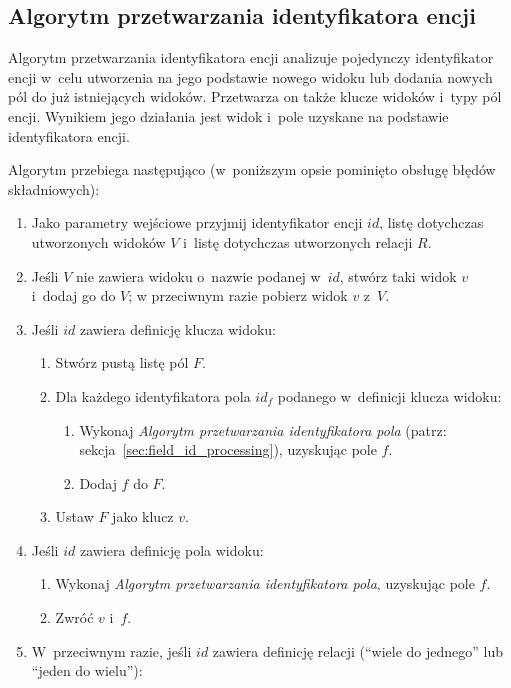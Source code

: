 \subsection{Algorytm przetwarzania identyfikatora encji} \label{sec:entity_id_processing}

Algorytm przetwarzania identyfikatora encji analizuje pojedynczy identyfikator encji w~celu utworzenia na jego podstawie nowego widoku lub dodania nowych pól do już istniejących widoków.
Przetwarza on także klucze widoków i~typy pól encji.
Wynikiem jego działania jest widok i~pole uzyskane na podstawie identyfikatora encji.

Algorytm przebiega następująco (w~poniższym opsie pominięto obsługę błędów składniowych):

\begin{enumerate}
 \item Jako parametry wejściowe przyjmij identyfikator encji $id$, listę dotychczas utworzonych widoków $V$ i~listę dotychczas utworzonych relacji $R$.
 \item Jeśli $V$ nie zawiera widoku o~nazwie podanej w~$id$, stwórz taki widok $v$ i~dodaj go do $V$; w przeciwnym razie pobierz widok $v$ z~$V$.
 \item Jeśli $id$ zawiera definicję klucza widoku:
  \begin{enumerate}
   \item Stwórz pustą listę pól $F$.
   \item Dla każdego identyfikatora pola $id_f$ podanego w~definicji klucza widoku:
    \begin{enumerate}
     \item Wykonaj \emph{Algorytm przetwarzania identyfikatora pola} (patrz: sekcja~\ref{sec:field_id_processing}), uzyskując pole $f$.
     \item Dodaj $f$ do $F$.
    \end{enumerate}
   \item Ustaw $F$ jako klucz $v$.
  \end{enumerate}
 \item Jeśli $id$ zawiera definicję pola widoku:
  \begin{enumerate}
   \item Wykonaj \emph{Algorytm przetwarzania identyfikatora pola}, uzyskując pole $f$.
   \item Zwróć $v$ i~$f$.
  \end{enumerate}
 \item W~przeciwnym razie, jeśli $id$ zawiera definicję relacji (``wiele do jednego'' lub ``jeden do wielu''):

\end{enumerate}
